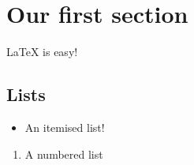 \section{Our first section}
\LaTeX{} is easy!

\subsection{Lists}
\begin{itemize}
  \item An itemised list!
\end{itemize}

\begin{enumerate}
  \item A numbered list
\end{enumerate}

